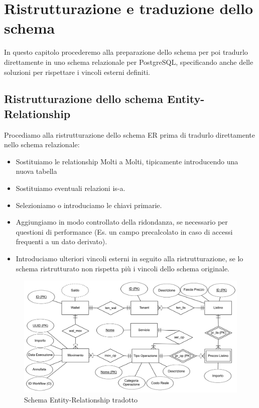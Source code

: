 \chapter{Ristrutturazione e traduzione dello schema}
In questo capitolo procederemo alla preparazione dello schema per poi tradurlo direttamente in uno schema relazionale per PostgreSQL, specificando anche delle soluzioni per
rispettare i vincoli esterni definiti.
\section{Ristrutturazione dello schema Entity-Relationship}
Procediamo alla ristrutturazione dello schema ER prima di tradurlo direttamente nello schema relazionale:
\begin{itemize}
  \item Sostituiamo le relationship Molti a Molti, tipicamente introducendo una nuova tabella
  \item Sostituiamo eventuali relazioni is-a.
  \item Selezioniamo o introduciamo le chiavi primarie.
  \item Aggiungiamo in modo controllato della ridondanza, se necessario per questioni di performance (Es. un campo precalcolato in caso di accessi frequenti a un dato derivato).
  \item Introduciamo ulteriori vincoli esterni in seguito alla ristrutturazione, se lo schema ristrutturato non rispetta pi\`u i vincoli dello schema originale.
\end{itemize}
\begin{figure}[H]
  \centering
  \includegraphics[width=13cm]{images/db-diagrams/er-diagram-ristrutturato.png}
  \caption{Schema Entity-Relationship tradotto}
\end{figure}

